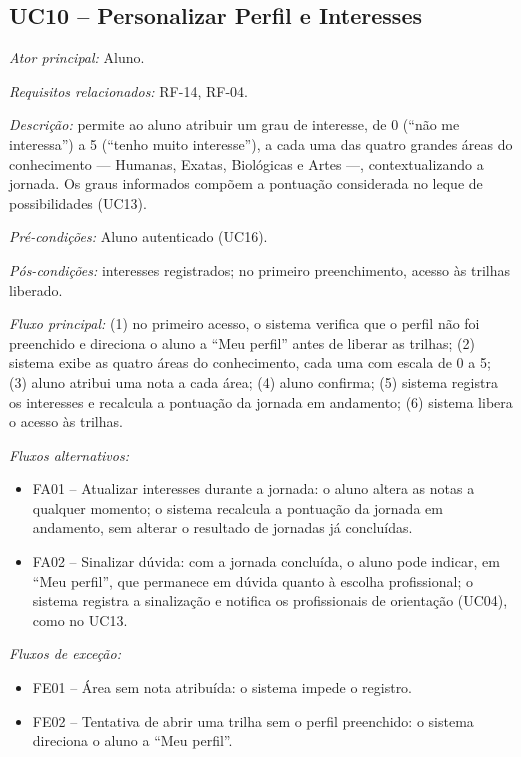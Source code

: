 \subsection*{UC10 -- Personalizar Perfil e Interesses}\label{uc:uc10}

\textit{Ator principal:} Aluno.

\textit{Requisitos relacionados:} RF-14, RF-04.

\textit{Descrição:} permite ao aluno atribuir um grau de interesse, de 0 (``não me interessa'') a 5 (``tenho muito interesse''), a cada uma das quatro grandes áreas do conhecimento — Humanas, Exatas, Biológicas e Artes —, contextualizando a jornada. Os graus informados compõem a pontuação considerada no leque de possibilidades (UC13).

\textit{Pré-condições:} Aluno autenticado (UC16).

\textit{Pós-condições:} interesses registrados; no primeiro preenchimento, acesso às trilhas liberado.

\textit{Fluxo principal:} (1) no primeiro acesso, o sistema verifica que o perfil não foi preenchido e direciona o aluno a ``Meu perfil'' antes de liberar as trilhas; (2) sistema exibe as quatro áreas do conhecimento, cada uma com escala de 0 a 5; (3) aluno atribui uma nota a cada área; (4) aluno confirma; (5) sistema registra os interesses e recalcula a pontuação da jornada em andamento; (6) sistema libera o acesso às trilhas.

\textit{Fluxos alternativos:}

\begin{itemize}[label={},leftmargin=\parindent,itemsep=0pt,topsep=0pt]
  \item FA01 – Atualizar interesses durante a jornada: o aluno altera as notas a qualquer momento; o sistema recalcula a pontuação da jornada em andamento, sem alterar o resultado de jornadas já concluídas.
  \item FA02 – Sinalizar dúvida: com a jornada concluída, o aluno pode indicar, em ``Meu perfil'', que permanece em dúvida quanto à escolha profissional; o sistema registra a sinalização e notifica os profissionais de orientação (UC04), como no UC13.
\end{itemize}

\textit{Fluxos de exceção:}

\begin{itemize}[label={},leftmargin=\parindent,itemsep=0pt,topsep=0pt]
  \item FE01 – Área sem nota atribuída: o sistema impede o registro.
  \item FE02 – Tentativa de abrir uma trilha sem o perfil preenchido: o sistema direciona o aluno a ``Meu perfil''.
\end{itemize}

